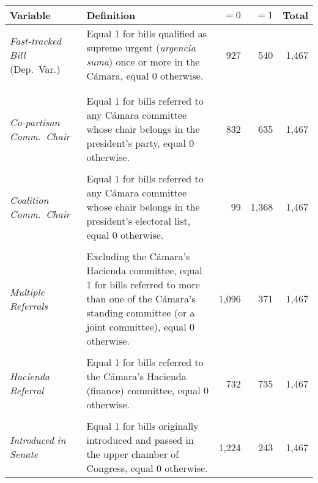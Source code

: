 \documentclass[letter,12pt]{article}
\begin{document}
\begin{footnotesize}
\singlespacing
\begin{tabularx}{\textwidth}{lXrrr} %
 Variable                      & Definition &   $=0$ &  $=1$ & Total \\ [.5ex] \hline
\emph{Fast-tracked Bill} (Dep.~Var.) & Equal 1 for bills qualified as supreme urgent (\emph{urgencia suma}) once or more in the C\'amara, equal 0 otherwise.          &    927  &   540 & 1,467 \\ [.5ex] %
\\ [-1ex]
\\ [-1ex]
\emph{Co-partisan Comm.~Chair}       & Equal 1 for bills referred to any C\'amara committee whose chair belongs in the president's party, equal 0 otherwise.          &    832 &   635 & 1,467 \\ [.5ex] %
\\ [-1ex]
\emph{Coalition Comm.~Chair}         & Equal 1 for bills referred to any C\'amara committee whose chair belongs in the president's electoral list, equal 0 otherwise. &     99 & 1,368 & 1,467 \\ [.5ex] %
\\ [-1ex]
\emph{Multiple Referrals}            & Excluding the C\'amara's Hacienda committee, equal 1 for bills referred to more than one of the C\'amara's standing committee (or a joint committee), equal 0 otherwise. &  1,096 &   371 & 1,467 \\ [.5ex] %
\\ [-1ex]
\emph{Hacienda Referral}             & Equal 1 for bills referred to the C\'amara's Hacienda (finance) committee, equal 0 otherwise.                                  &    732 &   735 & 1,467 \\ [.5ex] %
\\ [-1ex]
\emph{Introduced in Senate}          & Equal 1 for bills originally introduced and passed in the upper chamber of Congress, equal 0 otherwise.                      &  1,224 &   243 & 1,467 \\ [.5ex] %

\end{tabularx}
\end{footnotesize}
\end{document}

